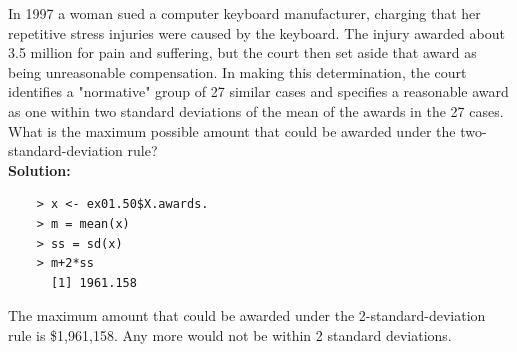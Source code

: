 \documentclass[12pt]{article}
\makeatletter
\theoremstyle{homework}
\newenvironment{exercise}[1]
{\def\@currentlabel{#1}\exercisecore}
{\endexercisecore}
\makeatother
\begin{document}
\begin{exercise}{1.50} In 1997 a woman sued a computer keyboard manufacturer, charging that her repetitive stress injuries were caused by the keyboard.
  The injury awarded about 3.5 million for pain and suffering, but the court then set aside that award as being unreasonable compensation. In making this 
  determination, the court identifies a "normative" group of 27 similar cases and specifies a reasonable award as one within two standard deviations of the mean of the awards in the 27 cases.
  What is the maximum possible amount that could be awarded under the two-standard-deviation rule?\\
  
  \textbf{Solution:} 
  \begin{lstlisting}
    > x <- ex01.50$X.awards.
    > m = mean(x)
    > ss = sd(x)
    > m+2*ss
      [1] 1961.158
  \end{lstlisting}
  The maximum amount that could be awarded under the 2-standard-deviation rule is \$1,961,158. Any more would not be within 2 standard deviations.
\end{exercise}
\vspace{1in}
\end{document}

